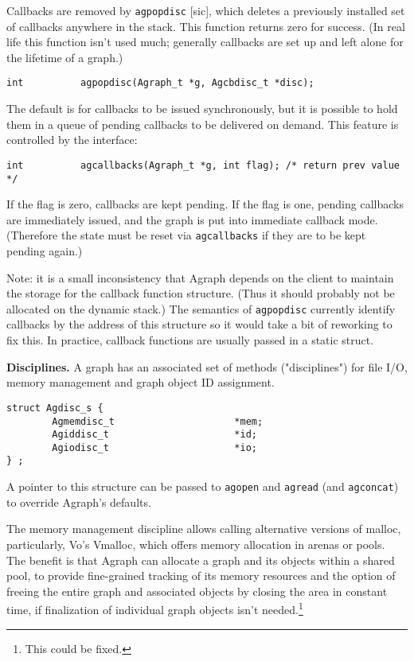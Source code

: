 \documentclass[11pt,letterpaper]{article}
\begin{document}
Callbacks are removed by \verb"agpopdisc" [sic], which deletes a
previously installed set of callbacks anywhere in the stack.
This function returns zero for success.  (In real life this
function isn't used much; generally callbacks are set up and
left alone for the lifetime of a graph.)

\begin{verbatim}
int          agpopdisc(Agraph_t *g, Agcbdisc_t *disc);
\end{verbatim}

The default is for callbacks to be issued synchronously, but it is 
possible to hold them in a queue of pending callbacks to be delivered
on demand.  This feature is controlled by the interface:

\begin{verbatim}
int          agcallbacks(Agraph_t *g, int flag); /* return prev value */
\end{verbatim}

If the flag is zero, callbacks are kept pending. 
If the flag is one, pending callbacks are immediately issued,
and the graph is put into immediate callback mode.
(Therefore the state must be reset via \verb"agcallbacks"
if they are to be kept pending again.)

Note: it is a small inconsistency that Agraph depends on the client
to maintain the storage for the callback function structure.
(Thus it should probably not be allocated on the dynamic stack.)
The semantics of \verb"agpopdisc" currently identify callbacks by
the address of this structure so it would take a bit of reworking
to fix this.  In practice, callback functions are usually passed
in a static struct.

{\bf Disciplines.}
A graph has an associated set of methods ("disciplines")
for file I/O, memory management and graph object ID assignment.

\begin{verbatim}
struct Agdisc_s {   
        Agmemdisc_t                     *mem;
        Agiddisc_t                      *id;
        Agiodisc_t                      *io;
} ;
\end{verbatim}

A pointer to this structure can be passed to \verb"agopen" and
\verb"agread" (and \verb"agconcat") to override Agraph's defaults.

The memory management discipline allows calling alternative versions
of malloc, particularly, Vo's Vmalloc, which offers memory allocation
in arenas or pools.  The benefit is that Agraph can allocate a graph
and its objects within a shared pool,
to provide fine-grained tracking of its memory resources
and the option of freeing the entire graph and associated objects
by closing the area in constant time, if finalization of individual
graph objects isn't needed.\footnote{This could be fixed.}
\end{document}
